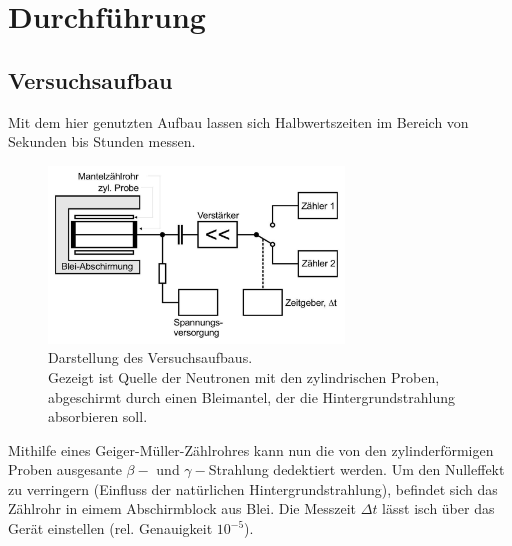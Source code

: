 \newpage
\section{Durchführung}
\label{sec:Durchfuehrung}
\subsection{Versuchsaufbau}
Mit dem hier genutzten Aufbau lassen sich Halbwertszeiten im Bereich von Sekunden bis Stunden messen.
\begin{figure}
    \centering
    \includegraphics[width=0.7\textwidth]{bilder/Versuchsaufbau.jpg}
    \caption{Darstellung des Versuchsaufbaus.\\
    Gezeigt ist Quelle der Neutronen mit den zylindrischen Proben, abgeschirmt durch einen Bleimantel,
    der die Hintergrundstrahlung absorbieren soll.\cite[217]{anleitung}}
\end{figure}

Mithilfe eines Geiger-Müller-Zählrohres kann nun die von den zylinderförmigen Proben ausgesante $\beta-$ und 
$\gamma-$Strahlung dedektiert werden. Um den Nulleffekt zu verringern (Einfluss der natürlichen Hintergrundstrahlung),
befindet sich das Zählrohr in eimem Abschirmblock aus Blei.
Die Messzeit $\Delta t$ lässt isch über das Gerät einstellen (rel. Genauigkeit $10^{-5}$).
